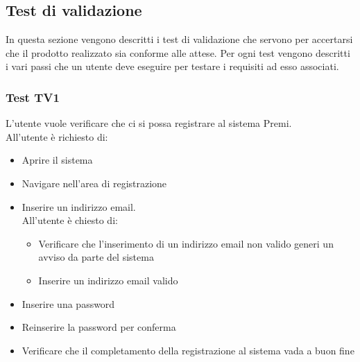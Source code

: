 \subsection {Test di validazione}

In questa sezione vengono descritti i test di validazione che servono per accertarsi che il prodotto realizzato sia conforme alle attese.
Per ogni test vengono descritti i vari passi che un utente deve eseguire per testare i requisiti ad esso associati.

\subsubsection {Test TV1} %
L'utente vuole verificare che ci si possa registrare al sistema Premi.\\
All'utente è richiesto di:
\begin{itemize}
	\item Aprire il sistema
	\item Navigare nell'area di registrazione
	\item Inserire un indirizzo email. \\
	         All'utente è chiesto di: 
	         \begin{itemize}
	         	\item Verificare che l'inserimento di un indirizzo email non valido generi un avviso da parte del sistema
	         	\item Inserire un indirizzo email valido
	         \end{itemize}
	\item Inserire una password
	\item Reinserire la password per conferma
	\item Verificare che il completamento della registrazione al sistema vada a buon fine
\end{itemize}

